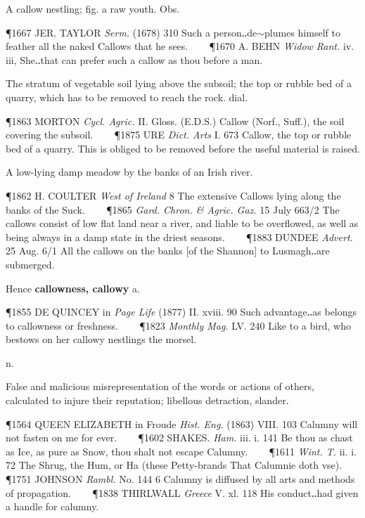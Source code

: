 \begin{description}[wide, labelwidth=!, labelindent=0pt]
\begin{myenumerate}
 A callow nestling; fig. a raw youth. Obs.

\P 1667 JER. TAYLOR  \textit{Serm.} (1678) 310 Such a person‥de$\sim$plumes himself to feather all the naked Callows that he sees.    
\P 1670 A. BEHN  \textit{Widow Rant.} iv. iii, She‥that can prefer such a callow as thou before a man.

 The stratum of vegetable soil lying above the subsoil; the top or rubble bed of a quarry, which has to be removed to reach the rock. dial.

\P 1863 MORTON  \textit{Cycl. Agric.} II. Gloss. (E.D.S.) Callow (Norf., Suff.), the soil covering the subsoil.    
\P 1875 URE  \textit{Dict. Arts} I. 673 Callow, the top or rubble bed of a quarry. This is obliged to be removed before the useful material is raised.

 A low-lying damp meadow by the banks of an Irish river.

\P 1862 H. COULTER  \textit{West of Ireland} 8 The extensive Callows lying along the banks of the Suck.    
\P 1865 \textit{Gard. Chron. \& Agric. Gaz.} 15 July 663/2 The callows consist of low flat land near a river, and liable to be overflowed, as well as being always in a damp state in the driest seasons.    
\P 1883 DUNDEE  \textit{Advert.} 25 Aug. 6/1 All the callows on the banks [of the Shannon] to Lusmagh‥are submerged.

\vspace{0.1cm} \noindent
Hence \textbf{callowness, callowy} a.

\P 1855 DE QUINCEY  in \textit{Page Life} (1877) II. xviii. 90 Such advantage‥as belongs to callowness or freshness.    
\P 1823 \textit{Monthly  Mag.} LV. 240 Like to a bird, who bestows on her callowy nestlings the morsel.
\end{myenumerate}


 n.

\noindent {}


\vspace{-0.3cm}

\begin{myenumerate}

 False and malicious misrepresentation of the words or actions of others, calculated to injure their reputation; libellous detraction, slander.

\P 1564 QUEEN  ELIZABETH in Froude \textit{Hist. Eng.} (1863) VIII. 103 Calumny will not fasten on me for ever.    
\P 1602 SHAKES.  \textit{Ham.} iii. i. 141 Be thou as chast as Ice, as pure as Snow, thou shalt not escape Calumny.    
\P 1611 \textit{Wint. T.} ii. i. 72 The Shrug, the Hum, or Ha (these Petty-brands That Calumnie doth vse).    
\P 1751 JOHNSON  \textit{Rambl.} No. 144 6 Calumny is diffused by all arts and methods of propagation.    
\P 1838 THIRLWALL  \textit{Greece} V. xl. 118 His conduct‥had given a handle for calumny.


\end{myenumerate}
\end{description}
